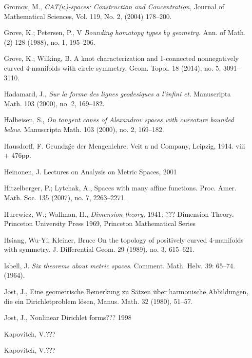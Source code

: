 \begin{thebibliography}{52}
 Gromov, M., \textit{CAT($\kappa$)-spaces: Construction and Concentration,} Journal of Mathematical Sciences, Vol. 119, No. 2, (2004) 178--200.


 Grove, K.; Petersen, P., V
\textit{Bounding homotopy types by geometry.}
Ann. of Math. (2) 128 (1988), no. 1, 195--206.

 Grove, K.; Wilking, B.
A knot characterization and 1-connected nonnegatively curved 4-manifolds with circle symmetry. 
Geom. Topol. 18 (2014), no. 5, 3091--3110. 

 Hadamard, J., \textit{Sur la forme des lignes geodesiques a l'infini et.}  Manuscripta Math.  103  (2000),  no. 2, 169--182.

 Halbeisen, S., \textit{On tangent cones of Alexandrov spaces with curvature
bounded below.}  Manuscripta Math.  103  (2000),  no. 2, 169--182.

  Hausdorff, F. Grundz\"ge der Mengenlehre. Veit a nd  Company, Leipzig, 1914. viii + 476pp.

Heinonen, J.
Lectures on Analysis on Metric Spaces,
2001


Hitzelberger, P.; Lytchak, A.,
Spaces with many affine functions. 
Proc. Amer. Math. Soc. 135 (2007), no. 7, 2263--2271.


 Hurewicz, W.; Wallman, H., \textit{Dimension theory,} 1941;
???  Dimension Theory. Princeton University Press 1969,
       Princeton Mathematical Series
       
Hsiang, Wu-Yi; Kleiner, Bruce
On the topology of positively curved 4-manifolds with symmetry.
J. Differential Geom. 29 (1989), no. 3, 615--621. 

 Isbell, J. \textit{Six theorems about metric spaces}. Comment. Math. Helv. 39: 65--74.(1964).

 Jost, J.,
Eine geometrische Bemerkung zu S\"atzen \"uber
harmonische Abbildungen, die ein Dirichletproblem l\"osen,
Manus. Math. 32  (1980),  51--57.

 Jost, J., Nonlinear Dirichlet forms??? 1998

Kapovitch, V.???

Kapovitch, V.???


\end{thebibliography}
